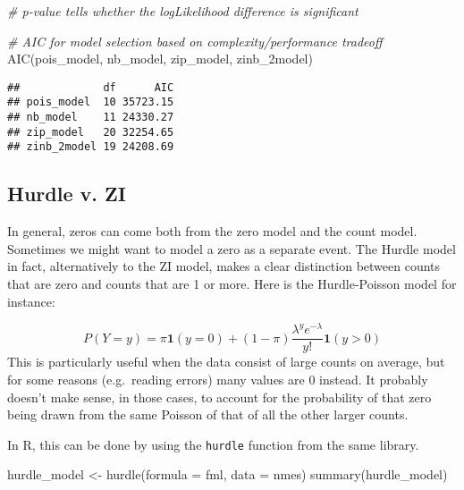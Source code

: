 \documentclass[
  oneside]{book}
\newenvironment{Shaded}{\begin{snugshade}}{\end{snugshade}}
\newcommand{\AttributeTok}[1]{\textcolor[rgb]{0.77,0.63,0.00}{#1}}
\newcommand{\CommentTok}[1]{\textcolor[rgb]{0.56,0.35,0.01}{\textit{#1}}}
\newcommand{\FunctionTok}[1]{\textcolor[rgb]{0.00,0.00,0.00}{#1}}
\newcommand{\NormalTok}[1]{#1}
\newcommand{\OtherTok}[1]{\textcolor[rgb]{0.56,0.35,0.01}{#1}}
\begin{document}
\begin{Shaded}
\begin{Highlighting}[]
\CommentTok{\# p{-}value tells whether the logLikelihood difference is significant}

\CommentTok{\# AIC for model selection based on complexity/performance tradeoff}
\FunctionTok{AIC}\NormalTok{(pois\_model, nb\_model, zip\_model, zinb\_2model)}
\end{Highlighting}
\end{Shaded}

\begin{verbatim}
##             df      AIC
## pois_model  10 35723.15
## nb_model    11 24330.27
## zip_model   20 32254.65
## zinb_2model 19 24208.69
\end{verbatim}

\hypertarget{hurdle-v.-zi}{%
\subsection{Hurdle v. ZI}\label{hurdle-v.-zi}}

In general, zeros can come both from the zero model and the count model. Sometimes we might
want to model a zero as a separate event. The Hurdle model in fact, alternatively to the ZI model,
makes a clear distinction between counts that are zero and counts that are 1 or more. Here
is the Hurdle-Poisson model for instance:

\[
P(Y = y) = \pi \bm{1}(y = 0) + (1 - \pi) \frac{\lambda^{y} e^{-\lambda}}{y!} \bm{1}(y > 0)
\]
This is particularly useful when the data consist of large counts on average, but for
some reasons (e.g.~reading errors) many values are 0 instead. It probably doesn't make
sense, in those cases, to account for the probability of that zero being drawn from the same
Poisson of that of all the other larger counts.

In R, this can be done by using the \texttt{hurdle} function from the same library.

\begin{Shaded}
\begin{Highlighting}[]
\NormalTok{hurdle\_model }\OtherTok{\textless{}{-}} \FunctionTok{hurdle}\NormalTok{(}\AttributeTok{formula =}\NormalTok{ fml, }\AttributeTok{data =}\NormalTok{ nmes)}
\FunctionTok{summary}\NormalTok{(hurdle\_model)}
\end{Highlighting}
\end{Shaded}
\end{document}
